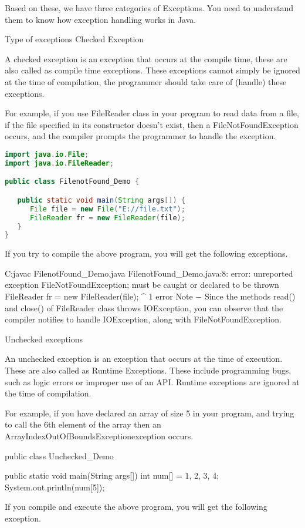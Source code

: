 Based on these, we have three categories of Exceptions. You need to understand them to know how exception handling works in Java.

Type of exceptions
Checked Exception

A checked exception is an exception that occurs at the compile time, these are also called as compile time exceptions. These exceptions cannot simply be ignored at the time of compilation, the programmer should take care of (handle) these exceptions.

For example, if you use FileReader class in your program to read data from a file, if the file specified in its constructor doesn't exist, then a FileNotFoundException occurs, and the compiler prompts the programmer to handle the exception.

\begin{lstlisting}[language=Java]
import java.io.File;
import java.io.FileReader;

public class FilenotFound_Demo {

   public static void main(String args[]) {
      File file = new File("E://file.txt");
      FileReader fr = new FileReader(file);
   }
}
\end{lstlisting}

If you try to compile the above program, you will get the following exceptions.

C:\>javac FilenotFound_Demo.java
FilenotFound_Demo.java:8: error: unreported exception FileNotFoundException; must be caught or declared to be thrown
      FileReader fr = new FileReader(file);
                      ^
1 error
Note − Since the methods read() and close() of FileReader class throws IOException, you can observe that the compiler notifies to handle IOException, along with FileNotFoundException.

Unchecked exceptions

An unchecked exception is an exception that occurs at the time of execution. These are also called as Runtime Exceptions. These include programming bugs, such as logic errors or improper use of an API. Runtime exceptions are ignored at the time of compilation.

For example, if you have declared an array of size 5 in your program, and trying to call the 6th element of the array then an ArrayIndexOutOfBoundsExceptionexception occurs.

public class Unchecked_Demo {

   public static void main(String args[]) {
      int num[] = {1, 2, 3, 4};
      System.out.println(num[5]);
   }
}
If you compile and execute the above program, you will get the following exception.

